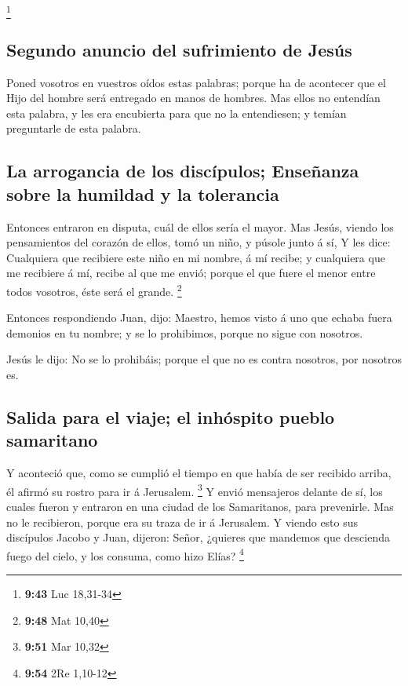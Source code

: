 \footnote{\textbf{9:43} Luc 18,31-34}

\hypertarget{segundo-anuncio-del-sufrimiento-de-jesuxfas}{%
\subsection{Segundo anuncio del sufrimiento de
Jesús}\label{segundo-anuncio-del-sufrimiento-de-jesuxfas}}

 Poned vosotros en vuestros oídos estas palabras; porque ha
de acontecer que el Hijo del hombre será entregado en manos de hombres.
 Mas ellos no entendían esta palabra, y les era encubierta
para que no la entendiesen; y temían preguntarle de esta palabra.

\hypertarget{la-arrogancia-de-los-discuxedpulos-enseuxf1anza-sobre-la-humildad-y-la-tolerancia}{%
\subsection{La arrogancia de los discípulos; Enseñanza sobre la humildad
y la
tolerancia}\label{la-arrogancia-de-los-discuxedpulos-enseuxf1anza-sobre-la-humildad-y-la-tolerancia}}

 Entonces entraron en disputa, cuál de ellos sería el
mayor.  Mas Jesús, viendo los pensamientos del corazón de
ellos, tomó un niño, y púsole junto á sí,  Y les dice:
Cualquiera que recibiere este niño en mi nombre, á mí recibe; y
cualquiera que me recibiere á mí, recibe al que me envió; porque el que
fuere el menor entre todos vosotros, éste será el grande. \footnote{\textbf{9:48}
  Mat 10,40}

 Entonces respondiendo Juan, dijo: Maestro, hemos visto á
uno que echaba fuera demonios en tu nombre; y se lo prohibimos, porque
no sigue con nosotros.

 Jesús le dijo: No se lo prohibáis; porque el que no es
contra nosotros, por nosotros es.

\hypertarget{salida-para-el-viaje-el-inhuxf3spito-pueblo-samaritano}{%
\subsection{Salida para el viaje; el inhóspito pueblo
samaritano}\label{salida-para-el-viaje-el-inhuxf3spito-pueblo-samaritano}}

 Y aconteció que, como se cumplió el tiempo en que había de
ser recibido arriba, él afirmó su rostro para ir á Jerusalem.
\footnote{\textbf{9:51} Mar 10,32}  Y envió mensajeros
delante de sí, los cuales fueron y entraron en una ciudad de los
Samaritanos, para prevenirle.  Mas no le recibieron, porque
era su traza de ir á Jerusalem.  Y viendo esto sus
discípulos Jacobo y Juan, dijeron: Señor, ¿quieres que mandemos que
descienda fuego del cielo, y los consuma, como hizo Elías? \footnote{\textbf{9:54}
  2Re 1,10-12}

